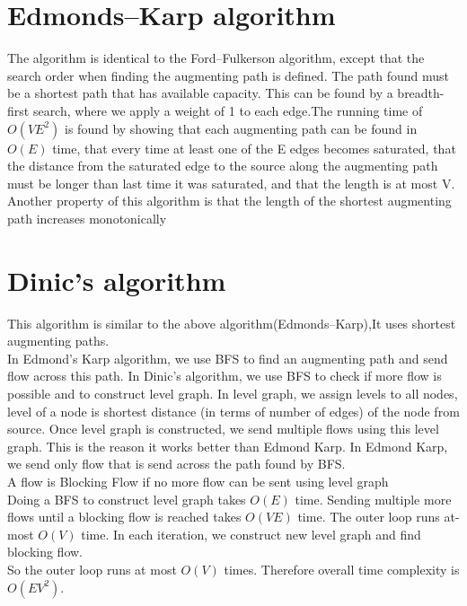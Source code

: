 \documentclass{article}
\begin{document}
    \section{Edmonds–Karp algorithm}
    The algorithm is identical to the Ford–Fulkerson algorithm, except that the search order when finding the augmenting path
     is defined. The path found must be a shortest path that has available capacity. This can be found by a breadth-first search, 
     where we apply a weight of 1 to each edge.The running time of $O(VE^2)$ is found by showing that each augmenting path can be found 
     in $O(E)$ time, that every time at least one of the E edges becomes saturated, that the distance  from  the  saturated  edge  to 
      the source along the augmenting path must be longer than  last  time  it  was saturated,  and  that  the  length  is  at  most  V.
      Another  property  of  this  algorithm  is  that  the  length  of  the  shortest augmenting path increases monotonically

    \section{Dinic's algorithm}
    This algorithm is similar to the above algorithm(Edmonds–Karp),It uses shortest augmenting paths.\\
    In Edmond’s Karp algorithm, we use BFS to find an augmenting path and send flow across this path. In Dinic’s algorithm, we use BFS to check if more flow is possible and to construct level graph. In level graph, we assign levels to all nodes, level of a node is shortest distance (in terms of number of edges) of the node from source. Once level graph is constructed, we send multiple flows using this level graph. This is the reason it works better than Edmond Karp. In Edmond Karp, we send only flow that is send across the path found by BFS.
    \\A flow is Blocking Flow if no more flow can be sent using level graph
    \\Doing a BFS to construct level graph takes $O(E)$ time. Sending multiple more flows until a blocking flow is reached takes $O(VE)$ time. The outer loop runs at-most $O(V)$ time. In each iteration, we construct new level graph and find blocking flow.
    \\So the outer loop runs at most $O(V)$ times. Therefore overall time complexity is $O(EV^2)$. 
\end{document}
